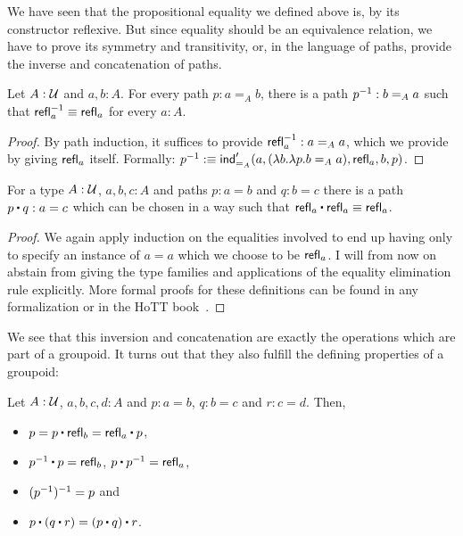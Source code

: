 We have seen that the propositional equality we defined above is, by its constructor
reflexive.
But since equality should be an equivalence relation, we have to prove its
symmetry and transitivity, or, in the language of paths, provide the inverse and
concatenation of paths.

\begin{defn}
Let $A : \mathcal{U}$ and $a, b : A$.
For every path $p : a =_A b$, there is a path $p^{-1} : b =_A a$ such that
$\mathsf{refl}_a^{-1} \equiv \mathsf{refl}_a$ for every $a : A$.
\end{defn}

\begin{proof}
By path induction, it suffices to provide $\mathsf{refl}_a^{-1} : a =_A a$, which we provide
by giving $\mathsf{refl}_a$ itself.
Formally:
$p^{-1} :\equiv \mathsf{ind}'_{=_A}(a, (\lambda b. \lambda p. b =_A a), \mathsf{refl}_a, b, p)$.
\end{proof}

\begin{defn}
For a type $A : \mathcal{U}$, $a, b, c : A$ and paths $p : a = b$ and $q : b = c$ there
is a path $p \ct q : a = c$ which can be chosen in a way such that
$\refl_a \ct \refl_a \equiv \refl_a$.
\end{defn}

\begin{proof}
We again apply induction on the equalities involved to end up having only to
specify an instance of $a = a$ which we choose to be $\mathsf{refl}_a$.
I will from now on abstain from giving the type families and applications
of the equality elimination rule explicitly.
More formal proofs for these definitions can be found in any formalization or
in the HoTT book~\cite{hottbook}.
\end{proof}

We see that this inversion and concatenation are exactly the operations which are
part of a groupoid.
It turns out that they also fulfill the defining properties of a groupoid:

\begin{defn}
Let $A : \mathcal{U}$, $a, b, c, d : A$ and $p : a = b$, $q : b = c$ and $r : c = d$.
Then,
\begin{itemize}
\item $p = p \ct \refl_b = \refl_a \ct p$,
\item $p\inv \ct p = \refl_b$, $p \ct p\inv = \refl_a$,
\item $(p^{-1})^{-1} = p$ and
\item $p \ct (q \ct r) = (p \ct q) \ct r$.
\end{itemize}
\end{defn}

